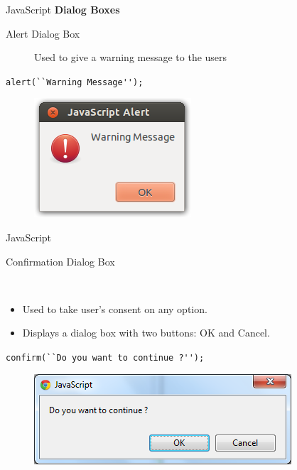 \documentclass[14pt]{beamer}
\begin{document}
\begin{frame}{JavaScript}
\textbf{Dialog Boxes}

\begin{description}
 \item [Alert Dialog Box] Used to give a warning message to the users
\end{description}
\begin{block}{}
\lstinline!alert(``Warning Message'');!
\end{block}

\begin{figure}[H]
 \centering
 \includegraphics[scale=.4]{alert-box.png}
\end{figure}
\end{frame}

\begin{frame}{JavaScript}
\begin{description}
 \item [Confirmation Dialog Box]\
\end{description} 
 \begin{itemize}
 \item Used to take user's consent on any option. 
 \item Displays a dialog box with two buttons: OK and Cancel.
\end{itemize}
\begin{block}{}
\lstinline!confirm(``Do you want to continue ?'');!
\end{block}
\begin{figure}[H]
\centering
\includegraphics[scale=.4]{conform-box.png}
\end{figure}
\end{frame}
\end{document}

